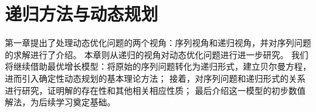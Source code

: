 

\chapter{递归方法与动态规划} \label{ch-opt-growth-dp}

第一章提出了处理动态优化问题的两个视角：序列视角和递归视角，并对序列问题的求解进行了介绍。
本章则从递归的视角对动态优化问题进行进一步研究。
我们将继续借助最优增长模型：将原始的序列问题转化为递归形式，建立贝尔曼方程，进而引入确定性动态规划的基本理论方法；
接着，对序列问题和递归形式的关系进行研究，证明解的存在性和其他相关相应性质；
最后介绍这一模型的初步数值解法，为后续学习奠定基础。









